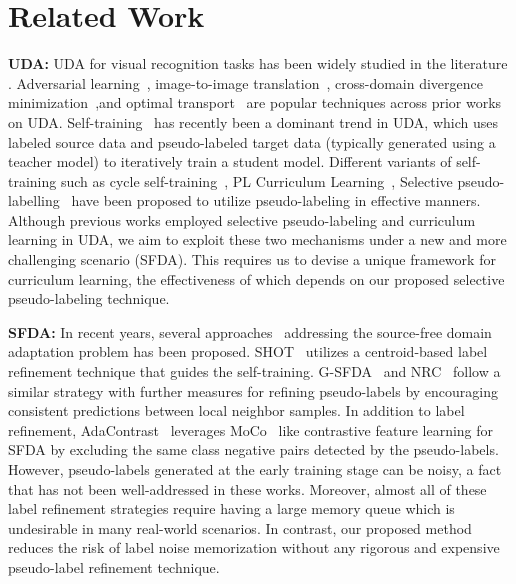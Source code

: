 \documentclass[10pt,twocolumn,letterpaper]{article}
\begin{document}
 
\vspace{-1mm}
\section{Related Work}
\vspace{-1mm}
\noindent \textbf{UDA:} 
UDA for visual recognition tasks has been widely studied in the literature \cite{csurka2017comprehensive, wang2018deep}. Adversarial learning~\cite{hoffman2018cycada, tzeng2017adversarial, vu2019advent, long2018conditional}, image-to-image translation~\cite{murez2018image, lee2018diverse, hoffman2018cycada}, cross-domain divergence minimization~\cite{li2020domain, chen2020homm, sun2016deep, shen2018wasserstein},and optimal transport~\cite{damodaran2018deepjdot, chen2020graph, RWOT} are popular techniques across prior works on UDA. Self-training~\cite{xie2020self, feng2021complementary, zou2018unsupervised, mei2020instance, yu2021dast} has recently been a dominant trend in UDA, which uses labeled source data and pseudo-labeled target data (typically generated using a teacher model) to iteratively train a student model. Different variants of self-training such as cycle self-training~\cite{liu2021cycle}, PL Curriculum Learning~\cite{choi2019pseudo}, Selective pseudo-labelling~\cite{wang2020unsupervised} have been proposed to utilize pseudo-labeling in effective manners. Although previous works employed selective pseudo-labeling and curriculum learning in UDA, we aim to exploit these two mechanisms under a new and more challenging scenario (SFDA). This requires us to devise a unique framework for curriculum learning, the effectiveness of which depends on our proposed selective pseudo-labeling technique.   


\noindent \textbf{SFDA:} In recent years, several approaches~\cite{SHOT,3CGAN,liu2021source,A2Net,G-SFDA,universalSFDA,VDM-DA,xu2021learning, prabhu2022augmentation, chen2022contrastive, ding2022source} addressing the source-free domain adaptation problem has been proposed. SHOT~\cite{SHOT} utilizes a centroid-based label refinement technique that guides the self-training. G-SFDA~\cite{G-SFDA} and NRC~\cite{yang2021exploiting} follow a similar strategy with further measures for refining pseudo-labels by encouraging consistent predictions between local neighbor samples. In addition to label refinement, AdaContrast~\cite{chen2022contrastive} leverages MoCo~\cite{he2020momentum} like contrastive feature learning for SFDA by excluding the same class negative pairs detected by the pseudo-labels. However, pseudo-labels generated at the early training stage can be noisy, a fact that has not been well-addressed in these works. Moreover, almost all of these label refinement strategies require having a large memory queue which is undesirable in many real-world scenarios. 
In contrast, our proposed method reduces the risk of label noise memorization without any rigorous and expensive pseudo-label refinement technique. 
\end{document}
